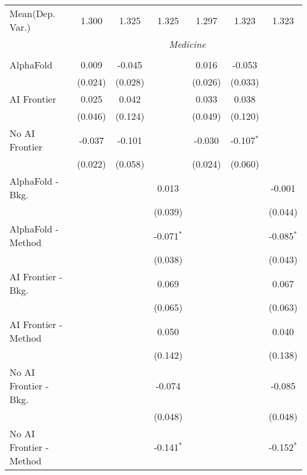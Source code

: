 \begin{tabular}{lcccccc}
Mean(Dep. Var.) & 1.300 & 1.325 & 1.325 & 1.297 & 1.323 & 1.323 \\
 & \multicolumn{6}{c}{\textit{Medicine}} \\ \\
   AlphaFold               & 0.009   & -0.045  &              & 0.016   & -0.053       &   \\   
                           & (0.024) & (0.028) &              & (0.026) & (0.033)      &   \\   
   AI Frontier             & 0.025   & 0.042   &              & 0.033   & 0.038        &   \\   
                           & (0.046) & (0.124) &              & (0.049) & (0.120)      &   \\   
   No AI Frontier          & -0.037  & -0.101  &              & -0.030  & -0.107$^{*}$ &   \\   
                           & (0.022) & (0.058) &              & (0.024) & (0.060)      &   \\   
   AlphaFold - Bkg.        &         &         & 0.013        &         &              & -0.001\\   
                           &         &         & (0.039)      &         &              & (0.044)\\   
   AlphaFold - Method      &         &         & -0.071$^{*}$ &         &              & -0.085$^{*}$\\   
                           &         &         & (0.038)      &         &              & (0.043)\\   
   AI Frontier - Bkg.      &         &         & 0.069        &         &              & 0.067\\   
                           &         &         & (0.065)      &         &              & (0.063)\\   
   AI Frontier - Method    &         &         & 0.050        &         &              & 0.040\\   
                           &         &         & (0.142)      &         &              & (0.138)\\   
   No AI Frontier - Bkg.   &         &         & -0.074       &         &              & -0.085\\   
                           &         &         & (0.048)      &         &              & (0.048)\\   
   No AI Frontier - Method &         &         & -0.141$^{*}$ &         &              & -0.152$^{*}$\\   

\end{tabular}
